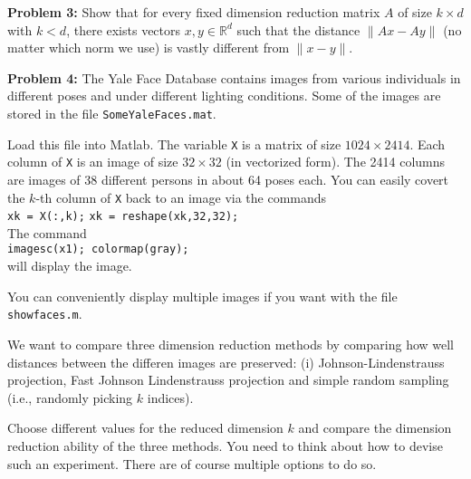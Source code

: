 \documentclass[12pt]{article}
\def\R{{\mathbb R}}
\begin{document}
\bigskip
\noindent
{\bf Problem 3:} 
Show that for every fixed dimension reduction matrix $A$ of size $k \times d$ with $k < d$, there exists vectors
$x,y \in \R^d$ such that the distance  $\|Ax-Ay\|$ (no matter which norm we use) is vastly different from
$\|x-y\|$.

\bigskip
\noindent
{\bf Problem 4:} 
The Yale Face Database contains images from various individuals in different poses and under different lighting
conditions. Some of the images are stored in the file {\tt SomeYaleFaces.mat}.

Load this file into Matlab. The variable {\tt X} is a matrix of size $1024 \times 2414$. Each column of {\tt X} 
is an image of size $32 \times 32$ (in vectorized form). 
The 2414 columns are images of 38 different persons in about 64 poses each.
You can easily covert the $k$-th column of {\tt X} back 
to an image via the commands \\
{\tt xk = X(:,k);} 
{\tt xk = reshape(xk,32,32);}  \\
The command \\ {\tt imagesc(x1); colormap(gray);} \\
will display the image.

You can conveniently display multiple images if you want with the file {\tt showfaces.m}.

We want to compare three dimension reduction methods by comparing how well distances between the differen images
are preserved: (i) Johnson-Lindenstrauss projection, Fast Johnson Lindenstrauss
projection and simple random sampling (i.e., randomly picking $k$ indices).  

Choose different values for the reduced dimension $k$ and compare the dimension reduction ability of the three
methods. You need to think about how to devise such an experiment. There are of course multiple options to do so.
\end{document}
